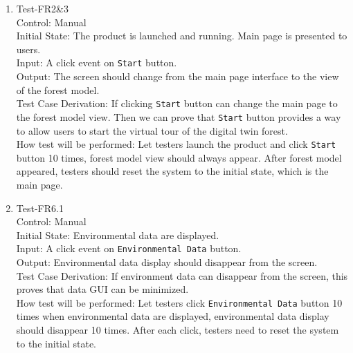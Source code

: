 \documentclass[12pt, titlepage]{article}
\begin{document}
\begin{enumerate}
\item{Test-FR2\&3\\}
Control: Manual\\ 

Initial State: The product is launched and running. Main page is
presented to users.\\

Input: A click event on \verb|Start| button.\\

Output: The screen should change from the main page
interface to the view of the forest model. \\

Test Case Derivation: If clicking \verb|Start| button can change the 
main page to the forest model view. Then we can prove that \verb|Start|
button provides a way to allow users to start the virtual tour of the 
digital twin forest.\\
					
How test will be performed:  Let testers launch the product and click 
\verb|Start| button 10 times, forest model view should always appear.
After forest model appeared, testers should reset the system to the 
initial state, which is the main page.

\item{Test-FR6.1\\}
Control: Manual\\ 

Initial State: Environmental data are displayed.\\

Input: A click event on \verb|Environmental Data| button.\\

Output: Environmental data display should disappear from the screen.\\

Test Case Derivation: If environment data can disappear from the 
screen, this proves that data GUI can be minimized.\\
     
How test will be performed: Let testers click 
\verb|Environmental Data| button 10 times when environmental data 
are displayed, environmental data display should disappear 10 times.
After each click, testers need to reset the system to the initial 
state.


\end{enumerate}
\end{document}
